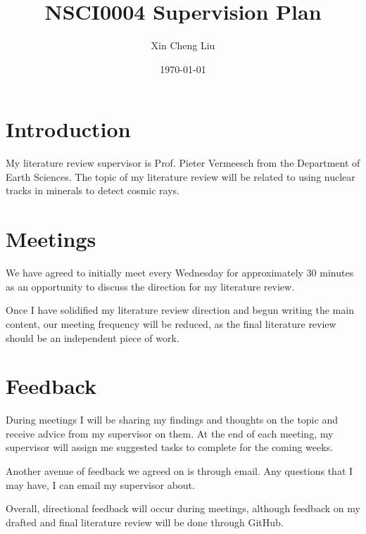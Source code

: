 \documentclass{article}
\title{NSCI0004 Supervision Plan}
\author{Xin Cheng Liu}
\date{\today}
\begin{document}
\maketitle

\section{Introduction}
My literature review supervisor is Prof. Pieter Vermeesch from the Department of Earth Sciences. The topic of my 
literature review will be related to using nuclear tracks in minerals to detect cosmic rays.

\section{Meetings}
We have agreed to initially meet every Wednesday for approximately 30 minutes as an opportunity to discuss the
direction for my literature review. 

Once I have solidified my literature review direction and begun writing the
main content, our meeting frequency will be reduced, as the final literature review should be an 
independent piece of work.

\section{Feedback}
During meetings I will be sharing my findings and thoughts on the topic and receive advice from my supervisor 
on them. At the end of each meeting, my supervisor will assign me suggested tasks to complete for the coming
weeks. 

Another avenue of feedback we agreed on is through email. Any questions that I may have, I can email my 
supervisor about.

Overall, directional feedback will occur during meetings, although feedback on my drafted and final
literature review will be done through GitHub.
\end{document}
